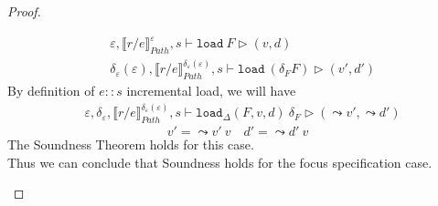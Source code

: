 \documentclass[10pt,twoside,a4paper]{article}
\theoremstyle{theorem}
\theoremstyle{lemma}
\theoremstyle{property}
\theoremstyle{definition}
\theoremstyle{assumption}
\begin{document}
\begin{proof}
\begin{enumerate}
	\begin{align*}
			& \varepsilon, \llbracket r/e \rrbracket^{\varepsilon}_{Path}, s \vdash \mathtt{load}~ F \rhd (v,d)\\
			& \delta_\varepsilon(\varepsilon), \llbracket r/e \rrbracket^{\delta_\varepsilon(\varepsilon)}_{Path}, s \vdash \mathtt{load} ~(\delta_F F) \rhd (v',d')
	\end{align*}
	By definition of $e::s$ incremental load, we will have
	\begin{align*}
			& \varepsilon, \delta_\varepsilon, \llbracket r/e \rrbracket^{\delta_\varepsilon(\varepsilon)}_{Path}, s \vdash \mathtt{load}_\Delta (F,v,d)~ \delta_F \rhd (\leadsto v',\leadsto d')
	\end{align*}
	\begin{displaymath}
		v' = \leadsto v' ~ v \quad d' = \leadsto d' ~ v
	\end{displaymath}
	The Soundness Theorem holds for this case.\\
	Thus we can conclude that Soundness holds for the focus specification case.
	\end{enumerate}
	

\end{proof}
\end{document}
